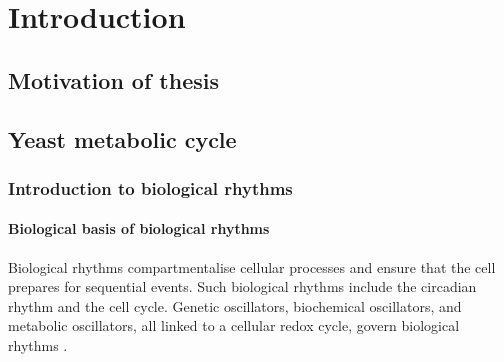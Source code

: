 
\chapter{Introduction}

\section{Motivation of thesis}


\section{Yeast metabolic cycle}
\label{sec:intro-ymc}

\subsection{Introduction to biological rhythms}
\label{subsec:intro-ymc-biological_rhythms}

\subsubsection{Biological basis of biological rhythms}
\label{subsubsec:intro-ymc-biological_rhythms-biological_basis}


Biological rhythms compartmentalise cellular processes and ensure that the cell prepares for sequential events.
Such biological rhythms include the circadian rhythm and the cell cycle.
Genetic oscillators, biochemical oscillators, and metabolic oscillators, all linked to a cellular redox cycle, govern biological rhythms \citep{mellorMolecularBasisMetabolic2016}.

